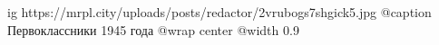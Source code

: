  
 
 
 
 

\ifcmt
  ig https://mrpl.city/uploads/posts/redactor/2vrubogs7shgick5.jpg
	@caption Первоклассники 1945 года
  @wrap center
  @width 0.9
\fi
